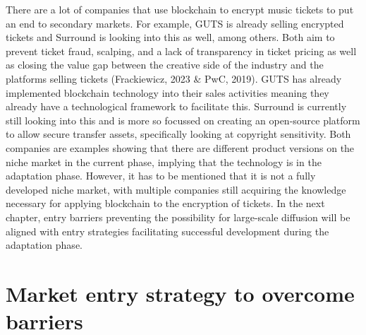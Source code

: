 \documentclass[a4paper,8pt,UTF8]{scrartcl}
\begin{document}
There are a lot of companies that use blockchain to encrypt music tickets to put an 
end to secondary markets. For example, GUTS is already selling encrypted tickets and 
Surround is looking into this as well, among others. Both aim to prevent ticket fraud, 
scalping, and a lack of transparency in ticket pricing as well as closing the value 
gap between the creative side of the industry and the platforms selling tickets 
(Frackiewicz, 2023\cite{frackiewicz2023} \& PwC, 2019\cite{pwc2023}). 
GUTS has already implemented blockchain technology into their sales activities meaning 
they already have a technological framework to facilitate this. Surround  is currently 
still looking into this and is more so focussed on creating an open-source platform 
to allow secure transfer assets, specifically looking at copyright sensitivity. 
Both companies are examples showing that there are different product versions on 
the niche market in the current phase, implying that the technology is in the 
adaptation phase. However, it has to be mentioned that it is not a fully developed 
niche market, with multiple companies still acquiring the knowledge necessary for applying blockchain to the encryption of tickets.  In the next chapter, entry barriers preventing the possibility for large-scale diffusion will be aligned with entry strategies facilitating successful development during the adaptation phase.




\section{Market entry strategy to overcome barriers}
\end{document}
